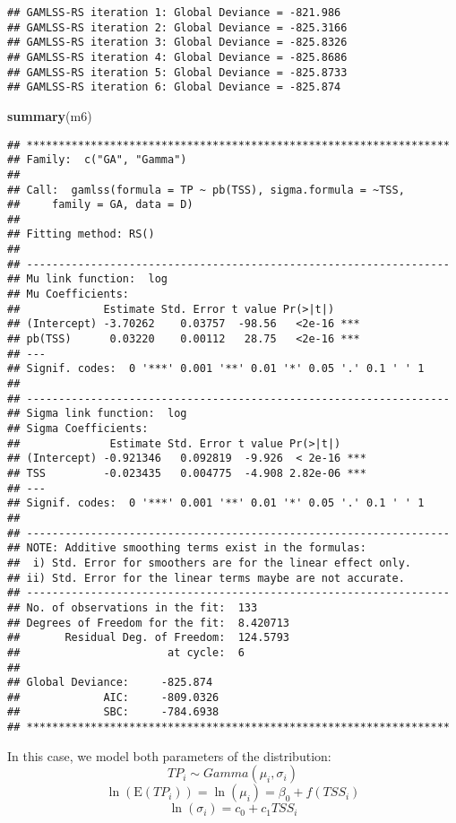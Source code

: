 \documentclass[
]{book}
\newenvironment{Shaded}{\begin{snugshade}}{\end{snugshade}}
\newcommand{\KeywordTok}[1]{\textcolor[rgb]{0.13,0.29,0.53}{\textbf{#1}}}
\newcommand{\NormalTok}[1]{#1}
\begin{document}
\begin{verbatim}
## GAMLSS-RS iteration 1: Global Deviance = -821.986 
## GAMLSS-RS iteration 2: Global Deviance = -825.3166 
## GAMLSS-RS iteration 3: Global Deviance = -825.8326 
## GAMLSS-RS iteration 4: Global Deviance = -825.8686 
## GAMLSS-RS iteration 5: Global Deviance = -825.8733 
## GAMLSS-RS iteration 6: Global Deviance = -825.874
\end{verbatim}

\begin{Shaded}
\begin{Highlighting}[]
\KeywordTok{summary}\NormalTok{(m6)}
\end{Highlighting}
\end{Shaded}

\begin{verbatim}
## ******************************************************************
## Family:  c("GA", "Gamma") 
## 
## Call:  gamlss(formula = TP ~ pb(TSS), sigma.formula = ~TSS,  
##     family = GA, data = D) 
## 
## Fitting method: RS() 
## 
## ------------------------------------------------------------------
## Mu link function:  log
## Mu Coefficients:
##             Estimate Std. Error t value Pr(>|t|)    
## (Intercept) -3.70262    0.03757  -98.56   <2e-16 ***
## pb(TSS)      0.03220    0.00112   28.75   <2e-16 ***
## ---
## Signif. codes:  0 '***' 0.001 '**' 0.01 '*' 0.05 '.' 0.1 ' ' 1
## 
## ------------------------------------------------------------------
## Sigma link function:  log
## Sigma Coefficients:
##              Estimate Std. Error t value Pr(>|t|)    
## (Intercept) -0.921346   0.092819  -9.926  < 2e-16 ***
## TSS         -0.023435   0.004775  -4.908 2.82e-06 ***
## ---
## Signif. codes:  0 '***' 0.001 '**' 0.01 '*' 0.05 '.' 0.1 ' ' 1
## 
## ------------------------------------------------------------------
## NOTE: Additive smoothing terms exist in the formulas: 
##  i) Std. Error for smoothers are for the linear effect only. 
## ii) Std. Error for the linear terms maybe are not accurate. 
## ------------------------------------------------------------------
## No. of observations in the fit:  133 
## Degrees of Freedom for the fit:  8.420713
##       Residual Deg. of Freedom:  124.5793 
##                       at cycle:  6 
##  
## Global Deviance:     -825.874 
##             AIC:     -809.0326 
##             SBC:     -784.6938 
## ******************************************************************
\end{verbatim}

In this case, we model both parameters of the distribution:
\[TP_i \sim Gamma(\mu_i, \sigma_i)\]
\[\ln(\text{E}(TP_i)) = \ln(\mu_i) =  \beta_0 + f(TSS_i)\]
\[\ln(\sigma_i) = c_0 + c_1TSS_i\]
\end{document}
